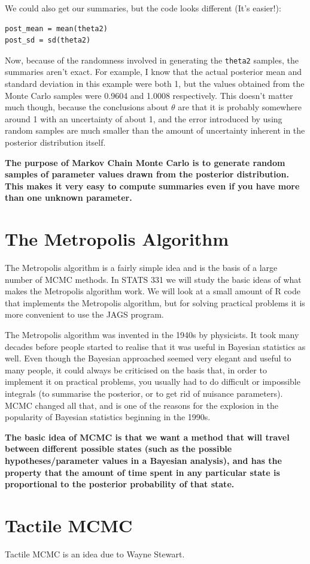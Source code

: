 We could also get our summaries, but the code looks different (It's easier!):
\begin{verbatim}
post_mean = mean(theta2)
post_sd = sd(theta2)
\end{verbatim}
Now, because of the randomness involved in generating the {\tt theta2} samples,
the summaries aren't exact. For example, I know that the actual posterior mean
and standard deviation in this example were both 1, but the values obtained
from the Monte Carlo samples were 0.9604 and 1.0008 respectively. This doesn't
matter much though, because the conclusions about $\theta$ are that it is probably
somewhere around 1 with an uncertainty of about 1, and the error introduced by
using random samples are much smaller than the amount of uncertainty inherent
in the posterior distribution itself.

\begin{framed}
{\bf
The purpose of Markov Chain Monte Carlo is to generate random samples of
parameter values drawn from the posterior distribution. This makes it very easy
to compute summaries even if you have more than one unknown parameter.}
\end{framed}


\section{The Metropolis Algorithm}
The Metropolis algorithm is a fairly simple idea and is the basis of a large
number of MCMC methods. In STATS 331 we will study the basic ideas of what
makes the Metropolis algorithm work. We will look at a small amount of R code
that implements the Metropolis algorithm, but for solving practical problems
it is more convenient to use the JAGS program.

The Metropolis algorithm was invented in the 1940s by physicists. It took
many decades before people started to realise that it was useful in Bayesian
statistics as well. Even though the Bayesian approached seemed very elegant and
useful to many people, it could always be criticised on the basis that, in order
to implement it on practical problems, you usually had to do difficult or
impossible integrals (to summarise the posterior, or to get rid of nuisance
parameters). MCMC changed all that, and is one of the reasons for the
explosion in the popularity of Bayesian statistics beginning in the 1990s.

\begin{framed}
{\bf
The basic idea of MCMC is that we want a method that will travel between
different possible states (such as the possible hypotheses/parameter values in
a Bayesian analysis), and has the property that the amount of time spent in
any particular state is proportional to the posterior probability of that state.}
\end{framed}



\section{Tactile MCMC}

Tactile MCMC is an idea due to Wayne Stewart.
